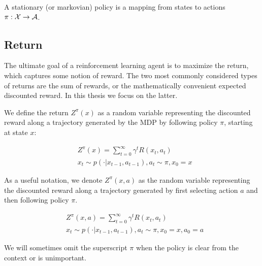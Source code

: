 \begin{definition}
A stationary (or markovian) policy is a mapping from states to actions $\pi:\mathcal{X} \to \mathcal{A}$.
\end{definition}


\subsection{Return}

The ultimate goal of a reinforcement learning agent is to maximize the return, which captures some notion of reward. The two most commonly considered types of returns are the sum of rewards, or the mathematically convenient expected discounted reward. In this thesis we focus on the latter.


We define the return $Z^\pi(x)$ as a random variable representing the discounted reward along a trajectory generated by the MDP by following policy $\pi$, starting at state $x$:

\begin{equation}\label{eqn:prelim:return}
\begin{split}
&Z^\pi(x)=\sum_{t=0}^\infty \gamma^tR(x_t,a_t)\\
&x_t \sim p(\cdot|x_{t-1}, a_{t-1}), a_t \sim \pi, x_0 = x
\end{split}
\end{equation}

As a useful notation, we denote $Z^\pi(x, a)$ as the random variable representing the discounted reward along a trajectory generated by first selecting action $a$ and then following policy $\pi$.

\begin{equation}
\begin{split}
&Z^\pi(x, a)=\sum_{t=0}^\infty \gamma^tR(x_t,a_t)\\
&x_t \sim p(\cdot|x_{t-1}, a_{t-1}), a_t \sim \pi, x_0 = x, a_0 = a
\end{split}
\end{equation}

We will sometimes omit the superscript $\pi$ when the policy is clear from the context or is unimportant.


